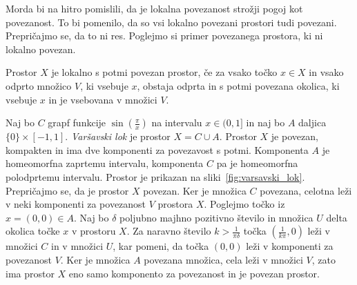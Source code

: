 \documentclass[../TG_magistrsko_delo_sections.tex]{subfiles}
\begin{document}
Morda bi na hitro pomislili, da je lokalna povezanost strožji pogoj kot povezanost. To bi pomenilo, da so vsi lokalno povezani prostori tudi povezani. Prepričajmo se, da to ni res. Poglejmo si primer povezanega prostora, ki ni lokalno povezan.


\begin{definicija}
Prostor $X$ je lokalno s potmi povezan prostor, če za vsako točko $ x\in X$ in vsako odprto množico $V$, ki vsebuje $x$, obstaja odprta in s potmi povezana okolica, ki vsebuje $x$ in je vsebovana v množici $V$.
\end{definicija}

\begin{primer}
Naj bo $C$ grapf funkcije $\sin\left(\frac{\pi}{x}\right)$ na intervalu $x \in (0 , 1]$ in naj bo $A$ daljica $\{ 0 \} \times [-1 , 1]$. \emph{Varšavski lok} je prostor $X = C \cup A$.
Prostor $X$ je povezan, kompakten in ima dve komponenti za povezavost s potmi. Komponenta $A$ je homeomorfna zaprtemu intervalu, komponenta $C$ pa je homeomorfna polodprtemu intervalu. Prostor je prikazan na sliki~\ref{fig:varsavski_lok}.
Prepričajmo se, da je prostor $X$ povezan. Ker je množica $C$ povezana, celotna leži v neki komponenti za povezanost $V$ prostora $X$. Poglejmo točko iz $x = (0, 0) \in  A$. Naj bo $\delta$ poljubno majhno pozitivno število in množica $U$ delta okolica točke $x$ v prostoru $X$. Za naravno število $k > \frac{1}{\pi \delta}$ točka $(\frac{1}{k \pi}, 0)$ leži v množici $C$ in v množici $U$, kar pomeni, da točka $(0, 0)$ leži v komponenti za povezanost $V$. Ker je množica $A$ povezana množica, cela leži v množici $V$, zato ima prostor $X$ eno samo komponento za povezanost in je povezan prostor.
\end{primer}
\end{document}

